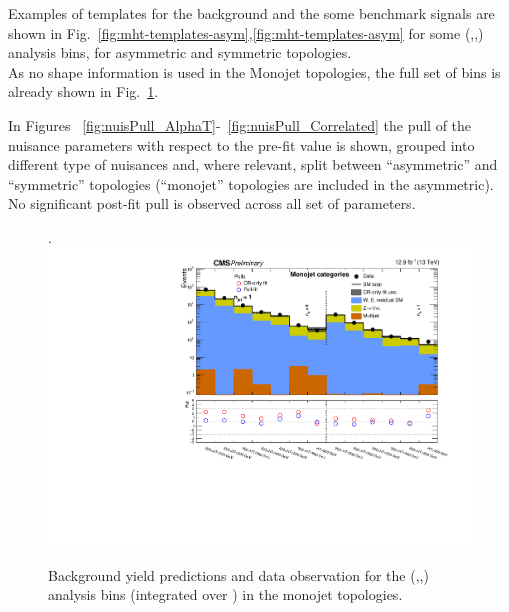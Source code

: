 Examples of \mht templates for the background and the some benchmark signals are shown in Fig.~\ref{fig:mht-templates-asym},\ref{fig:mht-templates-asym}  
for some (\njet,\nb,\scalht) analysis bins, for asymmetric and symmetric topologies.\\
As no \MHT shape information is used in the Monojet topologies, the full set of bins is already shown in Fig.~\ref{fig:summaryPlot_Monojet}. 

In Figures ~\ref{fig:nuisPull_AlphaT}-~\ref{fig:nuisPull_Correlated} the pull 
of the nuisance parameters with respect to the pre-fit value is shown, 
grouped into different type of nuisances and, where relevant, 
split between ``asymmetric'' and ``symmetric'' topologies 
(``monojet'' topologies are included in the asymmetric). \\
No significant post-fit pull is observed across all set of parameters. 



\clearpage

\clearpage

\clearpage


\clearpage

\clearpage

\clearpage





\clearpage
\begin{landscape}
  \begin{center}
    \begin{figure}[h!]
      \caption{Background yield predictions and data observation for the (\njet,\nb,\scalht) analysis bins (integrated over \MHT) in the monojet topologies. \label{fig:summaryPlot_Monojet}}.
      \includegraphics[width=0.8\linewidth]{figures/postFitResults/summaryPlots/summaryPlot_Monojet_prefit_overlay_fit_b}
    \end{figure}
  \end{center}
\end{landscape}

